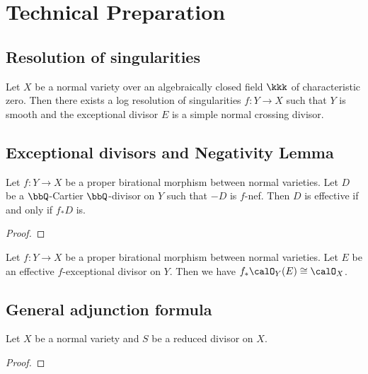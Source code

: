 \section{Technical Preparation}

\subsection{Resolution of singularities}

    \begin{theorem}\label{thm:log_resolution_in_characteristic_zero_for_varieties}
        Let \(X\) be a normal variety over an algebraically closed field \(\kkk\) of characteristic zero.
        Then there exists a log resolution of singularities \(f: Y \to X\) such that \(Y\) is smooth and the exceptional divisor \(E\) is a simple normal crossing divisor.
    \end{theorem}

\subsection{Exceptional divisors and Negativity Lemma}

    \begin{theorem}\label{thm:negativity_lemma}
        Let \(f: Y \to X\) be a proper birational morphism between normal varieties.
        Let \(D\) be a \(\bbQ\)-Cartier \(\bbQ\)-divisor on \(Y\) such that \(-D\) is \(f\)-nef.
        Then \(D\) is effective if and only if \(f_*D\) is.
    \end{theorem}
    \begin{proof}
    \end{proof}

    
    \begin{proposition}\label{prop:pushout_of_O_X_E_with_E_effective_exceptional_along_birational_morphism}
        Let \(f: Y \to X\) be a proper birational morphism between normal varieties.
        Let \(E\) be an effective \(f\)-exceptional divisor on \(Y\).
        Then we have \(f_* \calO_Y(E) \cong \calO_X\).
    \end{proposition}

\subsection{General adjunction formula}

    \begin{theorem}\label{thm:general_adjuction_formula}
        Let \(X\) be a normal variety and \(S\) be a reduced divisor on \(X\).
    \end{theorem}
    \begin{proof}
    \end{proof}



